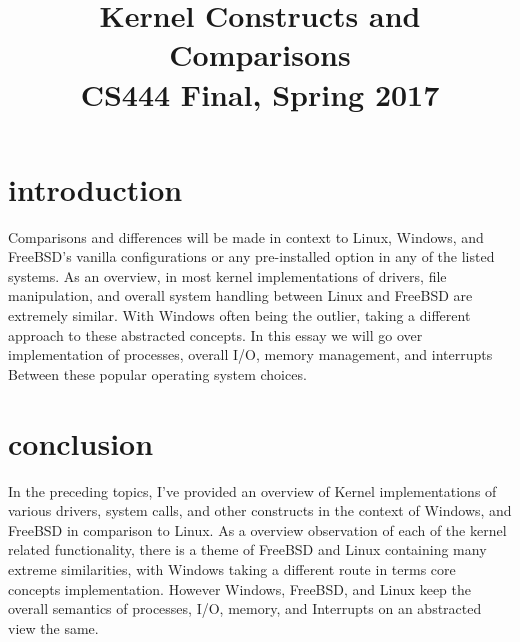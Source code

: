 \documentclass[letterpaper,10pt,titlepage]{IEEEtran}
\author{\name}
\title{Kernel Constructs and Comparisons\\
  	\large CS444 Final, Spring 2017}
\begin{document}
  \begin{titlepage}
      \maketitle
  \end{titlepage}
  
\section{introduction}
Comparisons and differences will be made in context to Linux, Windows, and FreeBSD's vanilla configurations or any pre-installed option in any of the listed systems. As an overview, in most kernel implementations of drivers, file manipulation, and overall system handling between Linux and FreeBSD are extremely similar. With Windows often being the outlier, taking a different approach to these abstracted concepts. In this essay we will go over implementation of processes, overall I/O, memory management, and interrupts Between these popular operating system choices.









\section{conclusion}
In the preceding topics, I've provided an overview of Kernel implementations of various drivers, system calls, and other constructs in the context of Windows, and FreeBSD in comparison to Linux. As a overview observation of each of the kernel related functionality, there is a theme of FreeBSD and Linux containing many extreme similarities, with Windows taking a different route in terms core concepts implementation. However Windows, FreeBSD, and Linux keep the overall semantics of processes, I/O, memory, and Interrupts on an abstracted view the same.

\nocite{*}%


\end{document}
